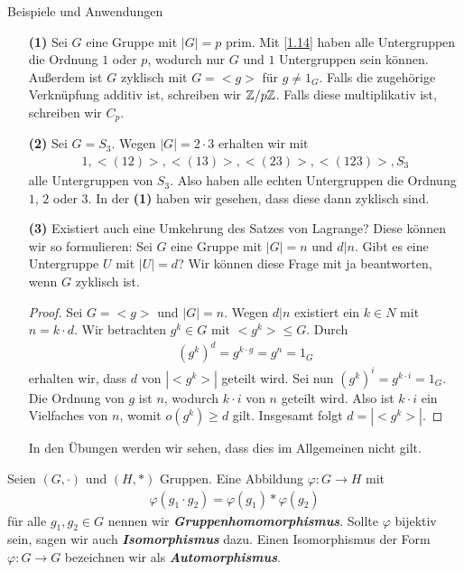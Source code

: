 \begin{genericdf}{Beispiele und Anwendungen}\label{1.15} \
\begin{enumerate}
\item[\textbf{(1)}]
Sei $G$ eine Gruppe mit $|G| = p$ prim.
Mit \ref{1.14} haben alle Untergruppen die Ordnung $1$ oder $p$, wodurch
nur $G$ und $1$ Untergruppen sein können.
Außerdem ist $G$ zyklisch mit $G =<g>$ für $g \neq 1_G$.
Falls die zugehörige Verknüpfung additiv ist, schreiben wir $\mathbb{Z}/p\mathbb{Z}$.
Falls diese multiplikativ ist, schreiben wir $C_p$.
\item[\textbf{(2)}]
Sei $G = S_3$. Wegen $|G| = 2 \cdot 3$ erhalten wir mit
\begin{align*}
1, <(12)>, <(13)>, <(23)>, <(123)>, S_3
\end{align*}
alle Untergruppen von $S_3$.
Also haben alle echten Untergruppen die Ordnung $1$, $2$ oder $3$.
In der \textbf{(1)} haben wir gesehen, dass diese dann zyklisch sind.
\item[\textbf{(3)}]
Existiert auch eine Umkehrung des Satzes von Lagrange? 
Diese können wir so formulieren:
Sei $G$ eine Gruppe mit $|G| = n$ und $d | n$.
Gibt es eine Untergruppe $U$ mit $|U| = d$?
Wir können diese Frage mit ja beantworten, wenn $G$ zyklisch ist.
\begin{proof}
Sei $G = <g>$ und $|G| = n$. Wegen $d | n $ existiert ein $k \in N$ mit $n = k \cdot d$.
Wir betrachten $g^k \in G$ mit $<g^k> \leq G$. Durch
\begin{align*}
(g^k)^d = g^{k\cdot g} = g^n = 1_G
\end{align*}
erhalten wir, dass $d$ von $|<g^k>|$ geteilt wird.
Sei nun $(g^k)^i = g^{k \cdot i}= 1_G$. Die Ordnung von $g$ ist $n$, wodurch $k \cdot i$ von $n$ geteilt wird.
Also ist $k\cdot i$ ein Vielfaches von $n$, womit $o(g^k) \geq d$ gilt.
Insgesamt folgt $d = | <g^k> | $.
\end{proof}
In den Übungen werden wir sehen, dass dies im Allgemeinen nicht gilt.
\end{enumerate}
\end{genericdf}

\begin{df}\label{1.16}
Seien $(G,\cdot)$ und $(H,\ast)$ Gruppen.
Eine Abbildung $\varphi : G \to H$ mit
\begin{align*}
\varphi(g_1 \cdot g_2) = \varphi(g_1) \ast \varphi(g_2)
\end{align*}
für alle $g_1, g_2 \in G$ nennen wir \textbf{\textit{Gruppenhomomorphismus}}.
Sollte $\varphi$ bijektiv sein, sagen wir auch \textbf{\textit{Isomorphismus}} dazu.
Einen Isomorphismus der Form $\varphi: G \to G$ bezeichnen wir als \textbf{\textit{Automorphismus}}.
\end{df}

